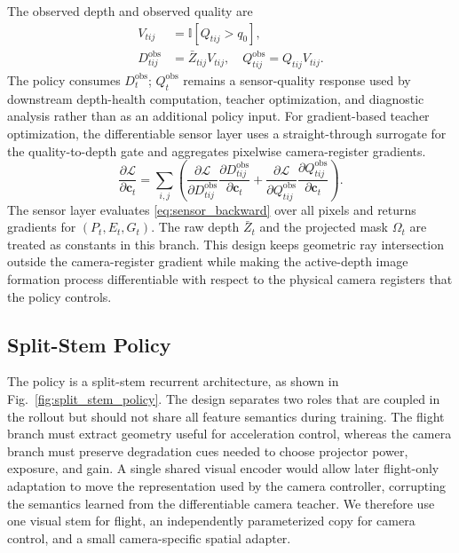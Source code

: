 \documentclass[letterpaper,journal]{IEEEtran}
\begin{document}
The observed depth and observed quality are
\begin{align}
    V_{tij} &= \mathbb{I}[Q_{tij}>q_0],\\
    D_{tij}^{\mathrm{obs}}
    &=\bar Z_{tij}V_{tij},\quad
    Q_{tij}^{\mathrm{obs}}=Q_{tij}V_{tij}.
    \label{eq:observed_depth_quality}
\end{align}
The policy consumes $D_t^{\mathrm{obs}}$; $Q_t^{\mathrm{obs}}$ remains a
sensor-quality response used by downstream depth-health computation, teacher
optimization, and diagnostic analysis rather than as an additional policy
input. For gradient-based teacher optimization, the differentiable sensor layer
uses a straight-through surrogate for the quality-to-depth gate and aggregates
pixelwise camera-register gradients.
\begin{equation}
    \frac{\partial\mathcal{L}}{\partial \mathbf{c}_t}
    =
    \sum_{i,j}
    \left(
    \frac{\partial\mathcal{L}}{\partial D_{tij}^{\mathrm{obs}}}
    \frac{\partial D_{tij}^{\mathrm{obs}}}{\partial \mathbf{c}_t}
    +
    \frac{\partial\mathcal{L}}{\partial Q_{tij}^{\mathrm{obs}}}
    \frac{\partial Q_{tij}^{\mathrm{obs}}}{\partial \mathbf{c}_t}
    \right).
    \label{eq:sensor_backward}
\end{equation}
The sensor layer evaluates \eqref{eq:sensor_backward} over all pixels and
returns gradients for $(P_t,E_t,G_t)$. The raw depth $\bar Z_t$ and the
projected mask $\Omega_t$ are treated as constants in this branch. This design
keeps geometric ray intersection outside the camera-register gradient while
making the active-depth image formation process differentiable with respect to
the physical camera registers that the policy controls.

\subsection{Split-Stem Policy}
The policy is a split-stem recurrent architecture, as
shown in Fig.~\ref{fig:split_stem_policy}. The design separates two roles that
are coupled in the rollout but should not share all feature semantics during
training. The flight branch must extract geometry useful for acceleration
control, whereas the camera branch must preserve degradation cues needed to
choose projector power, exposure, and gain. A single shared visual encoder
would allow later flight-only adaptation to move the representation used by
the camera controller, corrupting the semantics learned from the differentiable
camera teacher. We therefore use one visual stem for flight, an independently
parameterized copy for camera control, and a small camera-specific spatial
adapter.
\end{document}
